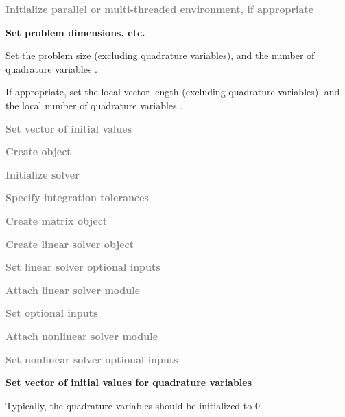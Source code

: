 \begin{Steps}

\item
  \textcolor{gray}{\bf Initialize parallel or multi-threaded environment,
  if appropriate}

\item
  {\bf Set problem dimensions, etc.}

  Set the problem size  (excluding quadrature variables),
  and the number of quadrature variables .

  If appropriate, set the local vector length  (excluding quadrature
   variables), and the local number of quadrature variables .

\item
  \textcolor{gray}{\bf Set vector of initial values}

\item\label{i:quad_cvode_create}
  \textcolor{gray}{\bf Create {\cvodes} object}

\item
  \textcolor{gray}{\bf Initialize {\cvodes} solver}

\item
  \textcolor{gray}{\bf Specify integration tolerances}

\item
  \textcolor{gray}{\bf Create matrix object}

\item
  \textcolor{gray}{\bf Create linear solver object}

\item
  \textcolor{gray}{\bf Set linear solver optional inputs}

\item
  \textcolor{gray}{\bf Attach linear solver module}

\item
  \textcolor{gray}{\bf Set optional inputs}

\item
  \textcolor{gray}{\bf Attach nonlinear solver module}

\item
  \textcolor{gray}{\bf Set nonlinear solver optional inputs}

\item
  {\bf Set vector  of initial values for quadrature variables}

  Typically, the quadrature variables should be initialized to $0$.


\end{Steps}
